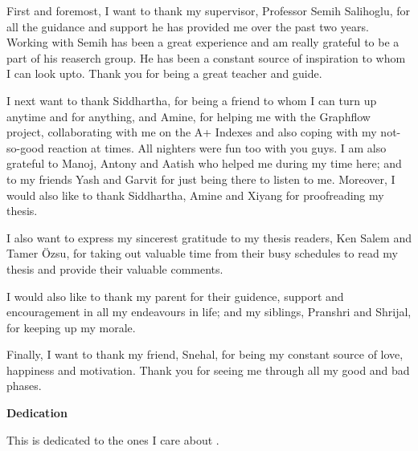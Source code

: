 First and foremost, I want to thank my supervisor, Professor Semih Salihoglu, for all the guidance and support he has provided me over the past two years. Working with Semih has been a great experience and am really grateful to be a part of his reaserch group. He has been a constant source of inspiration to whom I can look upto. Thank you for being a great teacher and guide.

I next want to thank Siddhartha, for being a friend to whom I can turn up anytime and for anything, and Amine, for helping me with the Graphflow project, collaborating with me on the A+ Indexes and also coping with my not-so-good reaction at times. All nighters were fun too with you guys. I am also grateful to Manoj, Antony and Aatish who helped me during my time here; and to my friends Yash and Garvit for just being there to listen to me. Moreover, I would also like to thank Siddhartha, Amine and Xiyang for proofreading my thesis.

I also want to express my sincerest gratitude to my thesis readers, Ken Salem and Tamer Özsu, for taking out valuable time from their busy schedules to read my thesis and provide their valuable comments. 

I would also like to thank my parent for their guidence, support and encouragement in all my endeavours in life; and my siblings, Pranshri and Shrijal, for keeping up my morale. 

Finally, I want to thank my friend, Snehal, for being my constant source of love, happiness and motivation. Thank you for seeing me through all my good and bad phases. 

\cleardoublepage


\begin{center}\textbf{Dedication}\end{center}

This is dedicated to the ones I care about .
\cleardoublepage

\renewcommand\contentsname{Table of Contents}
\tableofcontents
\cleardoublepage
{}    %

\listoffigures
\cleardoublepage
{}		%

\listoftables
\cleardoublepage
{}		%

\printglossaries
\cleardoublepage
{}		%


